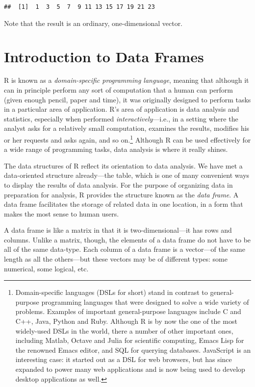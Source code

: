 \documentclass[]{book}
\let\rmarkdownfootnote\footnote%
\def\footnote{\protect\rmarkdownfootnote}
\theoremstyle{definition}
\theoremstyle{definition}
\theoremstyle{definition}
\theoremstyle{remark}
\begin{document}
{\begin{verbatim}
##  [1]  1  3  5  7  9 11 13 15 17 19 21 23
\end{verbatim}

Note that the result is an ordinary, one-dimensional vector.

\section{Introduction to Data Frames}\label{introduction-to-data-frames}

R is known as a \emph{domain-specific programming language}, meaning
that although it can in principle perform any sort of computation that a
human can perform (given enough pencil, paper and time), it was
originally designed to perform tasks in a particular area of
application. R's area of application is data analysis and statistics,
especially when performed \emph{interactively}---i.e., in a setting
where the analyst asks for a relatively small computation, examines the
results, modifies his or her requests and asks again, and so
on.\footnote{Domain-specific languages (DSLs for short) stand in
  contrast to general-purpose programming languages that were designed
  to solve a wide variety of problems. Examples of important
  general-purpose languages include C and C++, Java, Python and Ruby.
  Although R is by now the one of the most widely-used DSLs in the
  world, there a number of other important ones, including Matlab,
  Octave and Julia for scientific computing, Emacs Lisp for the renowned
  Emacs editor, and SQL for querying databases. JavaScript is an
  interesting case: it started out as a DSL for web browsers, but has
  since expanded to power many web applications and is now being used to
  develop desktop applications as well.} Although R can be used
effectively for a wide range of programming tasks, data analysis is
where it really shines.

The data structures of R reflect its orientation to data analysis. We
have met a data-oriented structure already---the table, which is one of
many convenient ways to display the results of data analysis. For the
purpose of organizing data in preparation for analysis, R provides the
structure known as the \emph{data frame}. A data frame
facilitates the storage of related data in one location, in a form that
makes the most sense to human users.

A data frame is like a matrix in that it is two-dimensional---it has
rows and columns. Unlike a matrix, though, the elements of a data frame
do not have to be all of the same data-type. Each column of a data frame
is a vector---of the same length as all the others---but these vectors
may be of different types: some numerical, some logical, etc.

}
\end{document}
